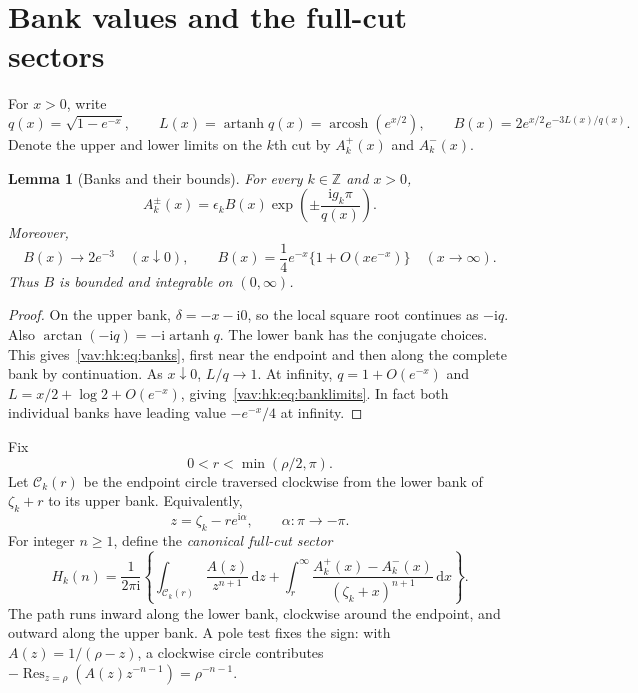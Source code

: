 \documentclass[11pt]{article}
\newtheorem{lemma}[theorem]{Lemma}
\theoremstyle{remark}\newtheorem{remark}[theorem]{Remark}
\newcommand{\ii}{\mathrm i}
\newcommand{\dd}{\,\mathrm d}
\newcommand{\atanh}{\operatorname{artanh}}
\newcommand{\acosh}{\operatorname{arcosh}}
\newcommand{\Z}{\mathbb Z}
\begin{document}
\section{Bank values and the full-cut sectors}\label{vav:hk:sec:hankel}
For $x>0$, write
\begin{equation}\label{vav:hk:eq:bankmod}
 q(x)=\sqrt{1-e^{-x}},\qquad L(x)=\atanh q(x)=\acosh(e^{x/2}),\qquad
 B(x)=2e^{x/2}e^{-3L(x)/q(x)}.
\end{equation}
Denote the upper and lower limits on the $k$th cut by $A_k^+(x)$ and $A_k^-(x)$.
\begin{lemma}[Banks and their bounds]\label{vav:hk:lem:banks}
For every $k\in\Z$ and $x>0$,
\begin{equation}\label{vav:hk:eq:banks}
 A_k^\pm(x)=\epsilon_kB(x)\exp\left(\pm\frac{\ii g_k\pi}{q(x)}\right).
\end{equation}
Moreover,
\begin{equation}\label{vav:hk:eq:banklimits}
 B(x)\longrightarrow2e^{-3}\quad(x\downarrow0),\qquad
 B(x)=\frac14e^{-x}\{1+O(xe^{-x})\}\quad(x\to\infty).
\end{equation}
Thus $B$ is bounded and integrable on $(0,\infty)$.
\end{lemma}
\begin{proof}
On the upper bank, $\delta=-x-\ii0$, so the local square root continues as $-\ii q$. Also $\arctan(-\ii q)=-\ii\atanh q$. The lower bank has the conjugate choices. This gives~\eqref{vav:hk:eq:banks}, first near the endpoint and then along the complete bank by continuation. As $x\downarrow0$, $L/q\to1$. At infinity, $q=1+O(e^{-x})$ and $L=x/2+\log2+O(e^{-x})$, giving~\eqref{vav:hk:eq:banklimits}. In fact both individual banks have leading value $-e^{-x}/4$ at infinity.
\end{proof}

Fix
\begin{equation}\label{vav:hk:eq:radius}
 0<r<\min(\rho/2,\pi).
\end{equation}
Let $\mathcal C_k(r)$ be the endpoint circle traversed clockwise from the lower bank of $\zeta_k+r$ to its upper bank. Equivalently,
\[
 z=\zeta_k-re^{\ii\alpha},\qquad \alpha:\pi\longrightarrow-\pi.
\]
For integer $n\geq1$, define the \emph{canonical full-cut sector}
\begin{equation}\label{vav:hk:eq:H}
 H_k(n)=\frac1{2\pi\ii}\left\{
 \int_{\mathcal C_k(r)}\frac{A(z)}{z^{n+1}}\dd z
 +\int_r^\infty\frac{A_k^+(x)-A_k^-(x)}{(\zeta_k+x)^{n+1}}\dd x
 \right\}.
\end{equation}
The path runs inward along the lower bank, clockwise around the endpoint, and outward along the upper bank. A pole test fixes the sign: with $A(z)=1/(\rho-z)$, a clockwise circle contributes $-\operatorname{Res}_{z=\rho}(A(z)z^{-n-1})=\rho^{-n-1}$.
\end{document}
